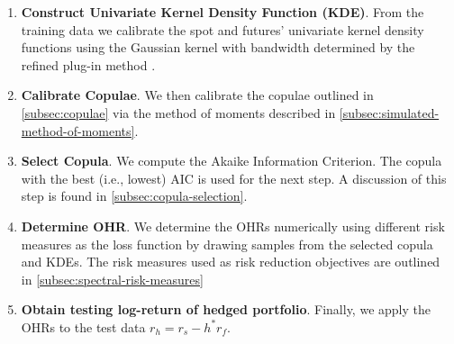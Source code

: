 \begin{enumerate}
\item \textbf{Construct Univariate Kernel Density Function (KDE)}.
  From the training data we calibrate the spot and futures'
  univariate kernel density functions using the Gaussian kernel with
  bandwidth determined by the refined plug-in method \citep[section
  3.3.3]{hardle2004nonparametric}.
\item \textbf{Calibrate Copulae}.
  We then calibrate the copulae outlined in \ref{subsec:copulae} via the
  method of moments described in \ref{subsec:simulated-method-of-moments}. 
\item \textbf{Select Copula}.
  We compute the Akaike Information Criterion. The copula with the
  best (i.e., lowest) AIC is used for the next step. 
  A discussion of this step is found in \ref{subsec:copula-selection}.
\item \textbf{Determine OHR}.
  We determine the OHRs numerically using different risk measures as
  the loss function by drawing samples from the selected copula and
  KDEs. The risk measures used as risk reduction objectives are
  outlined in \ref{subsec:spectral-risk-measures} 
  \item \textbf{Obtain testing log-return of hedged portfolio}.
  Finally, we apply the OHRs to the test data $r_h = r_s - h^* r_f$.
  \end{enumerate}












%

